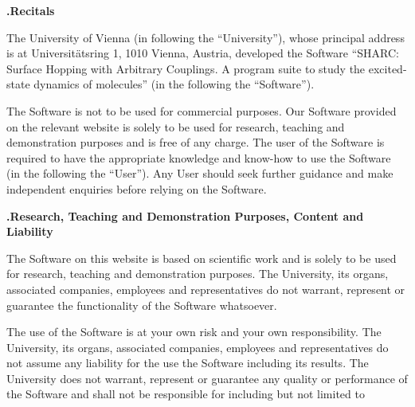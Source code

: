 \documentclass[a4paper,10pt,DIV=15,openany,twoside=false]{scrbook}
\begin{document}
\newcommand{\licensepara}[1]{\vspace{\bigskipamount}\addtocounter{licenseparacount}{1}\textbf{\thelicenseparacount.\quad#1}\newline}
{
\begin{shaded}
\licensepara{Recitals}

The University of Vienna (in following the ``University''), whose principal address is at Universit\"ats\-ring 1, 1010 Vienna, Austria, developed the Software ``SHARC: Surface Hopping with Arbitrary Couplings. A program suite to study the excited-state dynamics of molecules'' (in the following the ``Software'').

The Software is not to be used for commercial purposes. Our Software provided on the relevant website is solely to be used for research, teaching and demonstration purposes and is free of any charge. The user of the Software is required to have the appropriate knowledge and know-how to use the Software (in the following the ``User''). Any User should seek further guidance and make independent enquiries before relying on the Software.

\licensepara{Research, Teaching and Demonstration Purposes, Content and Liability}

The Software on this website is based on scientific work and is solely to be used for research, teaching and demonstration purposes. The University, its organs, associated companies, employees and representatives do not warrant, represent or guarantee the functionality of the Software whatsoever. 

The use of the Software is at your own risk and your own responsibility. The University, its organs, associated companies, employees and representatives do not assume any liability for the use the Software including its results. The University does not warrant, represent or guarantee any quality or performance of the Software and shall not be responsible for including but not limited to


\end{shaded}}
\end{document}

